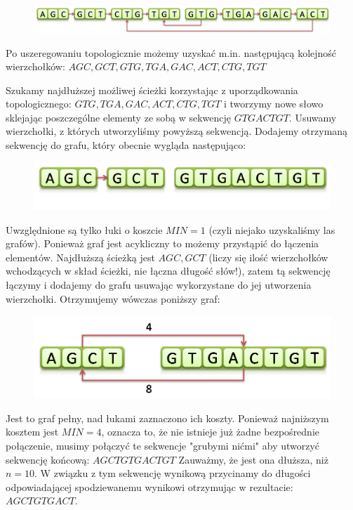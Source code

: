\documentclass[a4paper,10pt]{article}
\begin{document}
\begin{figure}[h]
  \footnotesize\centering
  \includegraphics[width=\textwidth,keepaspectratio]{Graph2.png}
\end{figure}

Po uszeregowaniu topologicznie możemy uzyskać m.in. następującą kolejność wierzchołków:
$AGC, GCT, GTG, TGA, GAC, ACT, CTG, TGT$

Szukamy najdłuższej możliwej ścieżki korzystając z uporządkowania topologicznego: $GTG, TGA, GAC, ACT, CTG, TGT$
i tworzymy nowe słowo sklejając poszczególne elementy ze sobą w sekwencję $GTGACTGT$.
Usuwamy wierzchołki, z których utworzyliśmy powyższą sekwencją. Dodajemy otrzymaną sekwencję do grafu, który obecnie wygląda następująco:

\begin{figure}[h]
  \footnotesize\centering
  \includegraphics[width=\textwidth,keepaspectratio]{Graph3.png}
\end{figure}

Uwzględnione są tylko łuki o koszcie $MIN=1$ (czyli niejako uzyskaliśmy las grafów). 
Ponieważ graf jest acykliczny to możemy przystąpić do łączenia elementów. 
Najdłuższą ścieżką jest $AGC, GCT$ (liczy się ilość wierzchołków wchodzących w skład ścieżki, nie łączna długość słów!), 
zatem tą sekwencję łączymy i dodajemy do grafu usuwając wykorzystane do jej utworzenia wierzchołki.
Otrzymujemy wówczas poniższy graf:

\begin{figure}[h]
  \footnotesize\centering
  \includegraphics[width=\textwidth,keepaspectratio]{Graph4.png}
\end{figure}
		 
Jest to graf pełny, nad łukami zaznaczono ich koszty. Ponieważ najniższym kosztem jest $MIN=4$, oznacza to, że nie istnieje już żadne bezpośrednie połączenie, musimy połączyć te sekwencje "grubymi nićmi" aby utworzyć sekwencję końcową:
$AGCTGTGACTGT$
Zauważmy, że jest ona dłuższa, niż $n=10$. W związku z tym sekwencję wynikową przycinamy do długości odpowiadającej spodziewanemu wynikowi otrzymując w rezultacie:
$AGCTGTGACT$.
\end{document}
